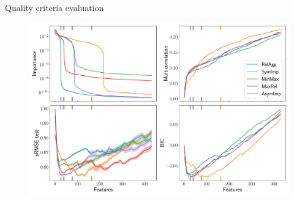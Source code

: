 \documentclass[9pt]{beamer}
\begin{document}
\begin{frame}{Quality criteria evaluation}
	\begin{figure}
		\includegraphics[width=\linewidth]{figs/ecog_3_30_metrics.pdf}
	\end{figure}
\end{frame}
\end{document}
